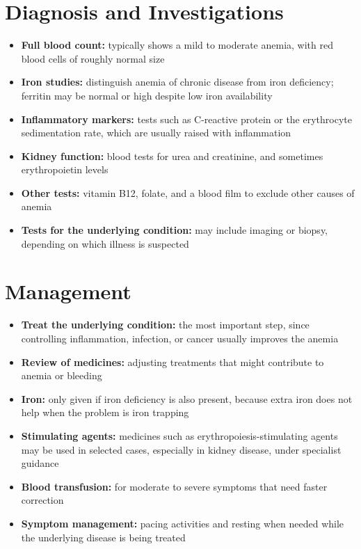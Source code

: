 \section*{Diagnosis and Investigations}
\begin{itemize}
    \item \textbf{Full blood count:} typically shows a mild to moderate anemia, with red blood cells of roughly normal size
    \item \textbf{Iron studies:} distinguish anemia of chronic disease from iron deficiency; ferritin may be normal or high despite low iron availability
    \item \textbf{Inflammatory markers:} tests such as C-reactive protein or the erythrocyte sedimentation rate, which are usually raised with inflammation
    \item \textbf{Kidney function:} blood tests for urea and creatinine, and sometimes erythropoietin levels
    \item \textbf{Other tests:} vitamin B12, folate, and a blood film to exclude other causes of anemia
    \item \textbf{Tests for the underlying condition:} may include imaging or biopsy, depending on which illness is suspected
\end{itemize}

\section*{Management}
\begin{itemize}
    \item \textbf{Treat the underlying condition:} the most important step, since controlling inflammation, infection, or cancer usually improves the anemia
    \item \textbf{Review of medicines:} adjusting treatments that might contribute to anemia or bleeding
    \item \textbf{Iron:} only given if iron deficiency is also present, because extra iron does not help when the problem is iron trapping
    \item \textbf{Stimulating agents:} medicines such as erythropoiesis-stimulating agents may be used in selected cases, especially in kidney disease, under specialist guidance
    \item \textbf{Blood transfusion:} for moderate to severe symptoms that need faster correction
    \item \textbf{Symptom management:} pacing activities and resting when needed while the underlying disease is being treated
\end{itemize}

